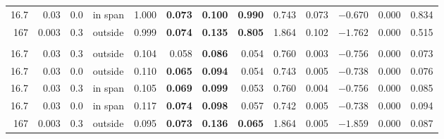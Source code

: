 \begin{table}[htbp]
\begin{tabular}{rrrlrrrrrrrrr}
16.7 & 0.03 & 0.0 & in span & 1.000 & \textbf{0.073} & \textbf{0.100} & \textbf{0.990} & 0.743 & 0.073 & $-0.670$ & 0.000 & 0.834 \\
167 & 0.003 & 0.3 & outside & 0.999 & \textbf{0.074} & \textbf{0.135} & \textbf{0.805} & 1.864 & 0.102 & $-1.762$ & 0.000 & 0.515 \\
\addlinespace
\multicolumn{13}{l}{\emph{C. Random Fourier features, $R^2=0.005$}} \\
16.7 & 0.03 & 0.3 & outside & 0.104 & 0.058 & \textbf{0.086} & 0.054 & 0.760 & 0.003 & $-0.756$ & 0.000 & 0.073 \\
16.7 & 0.03 & 0.0 & outside & 0.110 & \textbf{0.065} & \textbf{0.094} & 0.054 & 0.743 & 0.005 & $-0.738$ & 0.000 & 0.076 \\
16.7 & 0.03 & 0.3 & in span & 0.105 & \textbf{0.069} & \textbf{0.099} & 0.053 & 0.760 & 0.004 & $-0.756$ & 0.000 & 0.085 \\
16.7 & 0.03 & 0.0 & in span & 0.117 & \textbf{0.074} & \textbf{0.098} & 0.057 & 0.742 & 0.005 & $-0.738$ & 0.000 & 0.094 \\
167 & 0.003 & 0.3 & outside & 0.095 & \textbf{0.073} & \textbf{0.136} & \textbf{0.065} & 1.864 & 0.005 & $-1.859$ & 0.000 & 0.087 \\
\bottomrule
\end{tabular}
\end{table}
